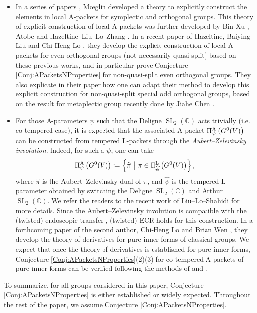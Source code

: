 \documentclass[11pt,letterpaper]{amsart}
\theoremstyle{plain}
\numberwithin{theorem}{section}
\numberwithin{equation}{subsection}
\theoremstyle{remark}
\newcommand{\SL}{\operatorname{SL}}
\newcommand{\C}{\mathbb{C}}
\def\LP{\Pi^{\rm L}} %
\def\AP{\Pi^{\rm A}} %
\begin{document}
\begin{itemize}
    \item In a series of papers \cite{MR2209850, MR2533005, MR2760663, MR2767522}, M{\oe}glin developed a theory to explicitly construct the elements in local A-packets for symplectic and orthogonal groups. This theory of explicit construction of local A-packets was further developed by Bin Xu \cite{MR3679701, MR4293795}, Atobe \cite{MR4472864, MR4661536} and Hazeltine--Liu--Lo--Zhang \cite{MR4912257}. In a recent paper of Hazeltine, Baiying Liu and Chi-Heng Lo \cite{HLLEvenOrthogonal26}, they develop the explicit construction of local A-packets for even orthogonal groups (not necessarily quasi-split) based on these previous works, and in particular prove Conjecture \ref{Conj:APacketsNProperties} for non-quasi-split even orthogonal groups. They also explicate in their paper how one can adapt their method to develop this explicit construction for non-quasi-split special odd orthogonal groups, based on the result for metaplectic group recently done by Jiahe Chen \cite{chen2026construction}. 

    \vskip 5pt

    \item For those A-parameters $\psi$ such that the Deligne $\SL_2(\C)$ acts trivially (i.e. co-tempered case), it is expected that the associated A-packet $\AP_\psi\left(G^0(V)\right)$ can be constructed from tempered L-packets through the \emph{Aubert--Zelevinsky involution}. Indeed, for such a $\psi$, one can take
    \[
        \AP_\psi\left(G^0(V)\right) \coloneqq \left\{\widehat{\pi}~\big|~\pi\in\LP_{\widehat{\psi}}\left(G^0(V)\right)\right\},
    \]
    where $\widehat{\pi}$ is the Aubert--Zelevinsky dual of $\pi$, and $\widehat{\psi}$ is the tempered L-parameter obtained by switching the Deligne $\SL_2(\C)$ and Arthur $\SL_2(\C)$. We refer the readers to the recent work of Liu--Lo--Shahidi \cite[Sect. 5.3]{liu2024anti} for more details. Since the Aubert--Zelevinsky involution is compatible with the (twisted) endoscopic transfer \cite[Thm. 1.5]{MR2098406} \cite[Appendix]{MR3679701}, (twisted) ECR holds for this construction. In a forthcoming paper of the second author, Chi-Heng Lo and Brian Wen \cite{clw26}, they develop the theory of derivatives for pure inner forms of classical groups. We expect that once the theory of derivatives is established for pure inner forms, Conjecture \ref{Conj:APacketsNProperties}(2)(3) for co-tempered A-packets of pure inner forms can be verified following the methods of \cite{atobe2024local} and \cite{MR4549708}.
\end{itemize}
\vskip 5pt
To summarize, for all groups considered in this paper, Conjecture \ref{Conj:APacketsNProperties} is either established or widely expected. Throughout the rest of the paper, we assume Conjecture \ref{Conj:APacketsNProperties}.
\end{document}
